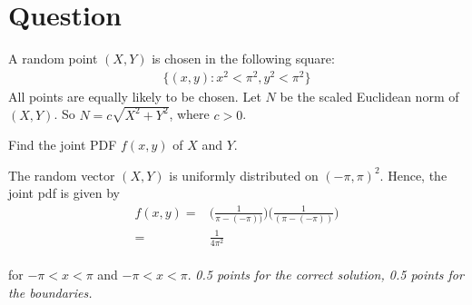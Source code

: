 \section{Question}

A random point $(X,Y)$ is chosen in the following square:
\begin{align*}
    \{(x, y) : x^2 < \pi^2,  y^2 < \pi^2 \}
\end{align*}
All points are equally likely to be chosen. Let $N$ be the scaled Euclidean norm of $(X,Y)$. So $N = c\sqrt{X^2 + Y^2}$, where $c > 0$.
\begin{exercise}[1]
Find the joint PDF $f(x,y)$ of $X$ and $Y$.
\begin{solution}
The random vector $(X,Y)$ is uniformly distributed on $(-\pi, \pi)^2$. Hence, the joint pdf is given by
\begin{align*}
    f(x,y) =& \Big(\frac{1}{\pi - (-\pi))} \Big) \Big(\frac{1}{(\pi - (-\pi))} \Big) \\
    =& \frac{1}{4 \pi^2}
\end{align*}\\
for $-\pi < x < \pi$ and $-\pi < x < \pi$.
\textit{0.5 points for the correct solution, 0.5 points for the boundaries.}
\end{solution}
\end{exercise}

